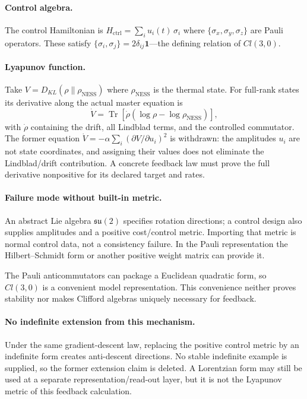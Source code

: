 \documentclass[12pt,a4paper,openany]{book}
\begin{document}
\paragraph{Control algebra.}
The control Hamiltonian is $H_{\mathrm{ctrl}} = \sum_i u_i(t)\, \sigma_i$ where $\{\sigma_x, \sigma_y, \sigma_z\}$ are Pauli operators.
These satisfy $\{\sigma_i, \sigma_j\} = 2\delta_{ij}\mathbf{1}$---the defining relation of $Cl(3,0)$.

\paragraph{Lyapunov function.}
Take $V = D_{KL}(\rho \| \rho_{\mathrm{NESS}})$ where $\rho_{\mathrm{NESS}}$ is the thermal state.
For full-rank states its derivative along the actual master equation is
\begin{equation}
\dot V
=\operatorname{Tr}\!\left[\dot\rho
(\log\rho-\log\rho_{\mathrm{NESS}})\right],
\end{equation}
with $\dot\rho$ containing the drift, all Lindblad terms, and the controlled commutator.  The former equation $\dot V=-\alpha\sum_i(\partial V/\partial u_i)^2$ is withdrawn: the amplitudes $u_i$ are not state coordinates, and assigning their values does not eliminate the Lindblad/drift contribution.  A concrete feedback law must prove the full derivative nonpositive for its declared target and rates.

\paragraph{Failure mode without built-in metric.}
An abstract Lie algebra $\mathfrak{su}(2)$ specifies rotation directions; a control design also supplies amplitudes and a positive cost/control metric.  Importing that metric is normal control data, not a consistency failure.  In the Pauli representation the Hilbert--Schmidt form or another positive weight matrix can provide it.

The Pauli anticommutators can package a Euclidean quadratic form, so $Cl(3,0)$ is a convenient model representation.  This convenience neither proves stability nor makes Clifford algebras uniquely necessary for feedback.

\paragraph{No indefinite extension from this mechanism.}
Under the same gradient-descent law, replacing the positive control metric by an indefinite form creates anti-descent directions.  No stable indefinite example is supplied, so the former extension claim is deleted.  A Lorentzian form may still be used at a separate representation/read-out layer, but it is not the Lyapunov metric of this feedback calculation.
\end{document}
